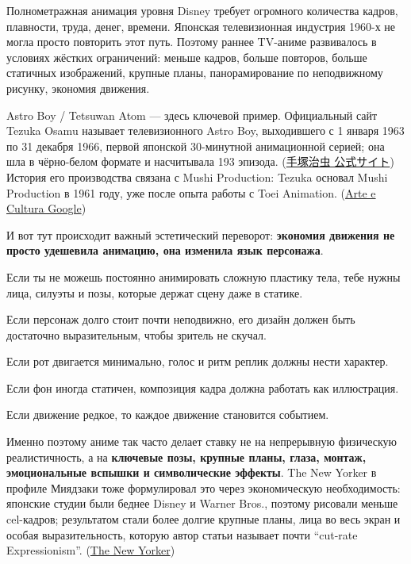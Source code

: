 Полнометражная анимация уровня Disney требует огромного количества
кадров, плавности, труда, денег, времени. Японская телевизионная
индустрия 1960-х не могла просто повторить этот путь. Поэтому раннее
TV-аниме развивалось в условиях жёстких ограничений: меньше кадров,
больше повторов, больше статичных изображений, крупные планы,
панорамирование по неподвижному рисунку, экономия движения.

Astro Boy /\hspace{0pt} Tetsuwan Atom --- здесь ключевой пример. Официальный сайт
Tezuka Osamu называет телевизионного Astro Boy, выходившего с 1 января
1963 по 31 декабря 1966, первой японской 30-минутной анимационной
серией; она шла в чёрно-белом формате и насчитывала 193 эпизода.
(\href{https://tezukaosamu.net/en/anime/30.html?utm_source=chatgpt.com}{手塚治虫
公式サイト}) История его производства связана с Mushi Production: Tezuka
основал Mushi Production в 1961 году, уже после опыта работы с Toei
Animation.
(\href{https://artsandculture.google.com/story/tezuka-osamu-the-dawn-of-tv-animation-tezuka-osamu/dgWBBNM8pRsA8A?hl=en\&utm_source=chatgpt.com}{Arte
e Cultura Google})

И вот тут происходит важный эстетический переворот: \textbf{экономия
движения не просто удешевила анимацию, она изменила язык персонажа}.

Если ты не можешь постоянно анимировать сложную пластику тела, тебе
нужны лица, силуэты и позы, которые держат сцену даже в статике.

Если персонаж долго стоит почти неподвижно, его дизайн должен быть
достаточно выразительным, чтобы зритель не скучал.

Если рот двигается минимально, голос и ритм реплик должны нести
характер.

Если фон иногда статичен, композиция кадра должна работать как
иллюстрация.

Если движение редкое, то каждое движение становится событием.

Именно поэтому аниме так часто делает ставку не на непрерывную
физическую реалистичность, а на \textbf{ключевые позы, крупные планы,
глаза, монтаж, эмоциональные вспышки и символические эффекты}. The New
Yorker в профиле Миядзаки тоже формулировал это через экономическую
необходимость: японские студии были беднее Disney и Warner Bros.,
поэтому рисовали меньше cel-кадров; результатом стали более долгие
крупные планы, лица во весь экран и особая выразительность, которую
автор статьи называет почти ``cut-rate Expressionism''.
(\href{https://www.newyorker.com/magazine/2005/01/17/hayao-miyazaki-anime-studio-ghibli-profile?utm_source=chatgpt.com}{The
New Yorker})

